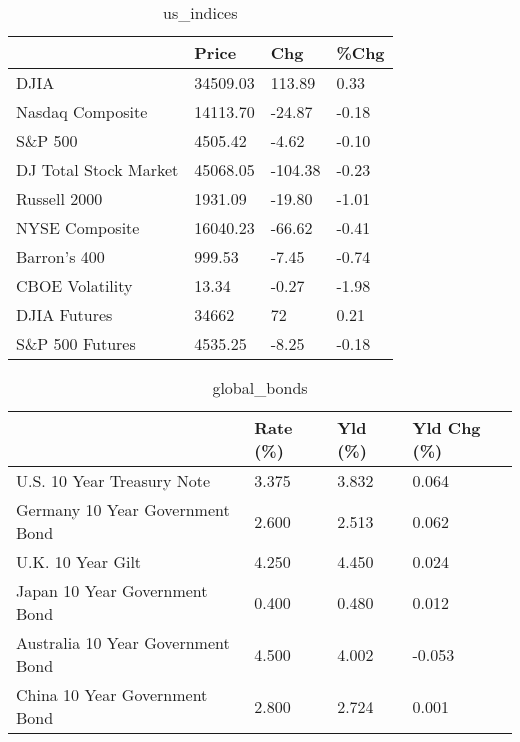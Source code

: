 \documentclass{article}%
\begin{document}
%


\begin{table}[htbp]%
\caption{us\_indices}%
\centering%
\begin{adjustbox}{width=1\textwidth}%
\begin{tabular}{llll}
\toprule
                      &    Price &     Chg &  \%Chg \\
\midrule
                 DJIA & 34509.03 &  113.89 &  0.33 \\
     Nasdaq Composite & 14113.70 &  -24.87 & -0.18 \\
              S\&P 500 &  4505.42 &   -4.62 & -0.10 \\
DJ Total Stock Market & 45068.05 & -104.38 & -0.23 \\
         Russell 2000 &  1931.09 &  -19.80 & -1.01 \\
       NYSE Composite & 16040.23 &  -66.62 & -0.41 \\
         Barron's 400 &   999.53 &   -7.45 & -0.74 \\
      CBOE Volatility &    13.34 &   -0.27 & -1.98 \\
         DJIA Futures &    34662 &      72 &  0.21 \\
      S\&P 500 Futures &  4535.25 &   -8.25 & -0.18 \\
\bottomrule
\end{tabular}
%
\end{adjustbox}%
\end{table}

%


\begin{table}[htbp]%
\caption{global\_bonds}%
\centering%
\begin{adjustbox}{width=1\textwidth}%
\begin{tabular}{llll}
\toprule
                                  & Rate (\%) & Yld (\%) & Yld Chg (\%) \\
\midrule
       U.S. 10 Year Treasury Note &    3.375 &   3.832 &       0.064 \\
  Germany 10 Year Government Bond &    2.600 &   2.513 &       0.062 \\
                U.K. 10 Year Gilt &    4.250 &   4.450 &       0.024 \\
    Japan 10 Year Government Bond &    0.400 &   0.480 &       0.012 \\
Australia 10 Year Government Bond &    4.500 &   4.002 &      -0.053 \\
    China 10 Year Government Bond &    2.800 &   2.724 &       0.001 \\
\bottomrule
\end{tabular}
%
\end{adjustbox}%
\end{table}
\end{document}

